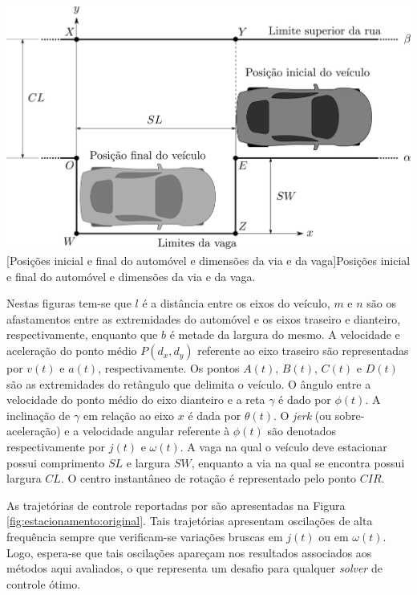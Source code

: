 \noindent	
\begin{minipage}{\textwidth}
	\vspace{\onelineskip}
	\centering
	\includegraphics[scale=0.14]{draw/resultados/pdf/estacionamentoVia}
	[Posições inicial e final do automóvel e  dimensões da via e da vaga]{Posições inicial e final do automóvel e dimensões da via e da vaga.}
	\label{fig:estacionamento:estacionamentoVia}
	\vspace{\onelineskip}
\end{minipage}

Nestas figuras tem-se que $ l $ é a distância entre os eixos do veículo, $ m $ e $ n $ são os afastamentos entre as extremidades do automóvel e os eixos traseiro e dianteiro, respectivamente, enquanto  que $ b $ é metade da largura do mesmo. A velocidade e aceleração do ponto médio $ P(d_x, d_y) $ referente ao eixo traseiro são representadas por $ v(t) $ e $ a(t) $, respectivamente. Os pontos $ A(t) $, $ B(t) $, $ C(t) $ e $ D(t) $ são as extremidades do retângulo que delimita o veículo. O ângulo entre a velocidade do ponto médio do eixo dianteiro e a reta $ \gamma $ é dado por $ \phi(t) $. A inclinação de $ \gamma $ em relação ao eixo $ x $ é dada por $ \theta(t) $. O \textit{jerk} (ou sobre-aceleração) e a velocidade angular referente à $\phi(t)$ são denotados respectivamente por $ j(t) $ e $ \omega(t) $. A vaga na qual o veículo deve estacionar possui comprimento $ SL $ e largura $ SW $, enquanto a via na qual se encontra possui largura $ CL $. O centro instantâneo de rotação é representado pelo ponto $ CIR $. 


As trajetórias de controle reportadas por  são apresentadas na Figura \ref{fig:estacionamento:original}. Tais trajetórias apresentam oscilações de alta frequência sempre que verificam-se variações bruscas em $ j(t) $ ou em $ \omega(t) $. Logo, espera-se que tais oscilações apareçam nos resultados associados aos métodos aqui avaliados, o que representa um desafio para qualquer \textit{solver} de controle ótimo. 

